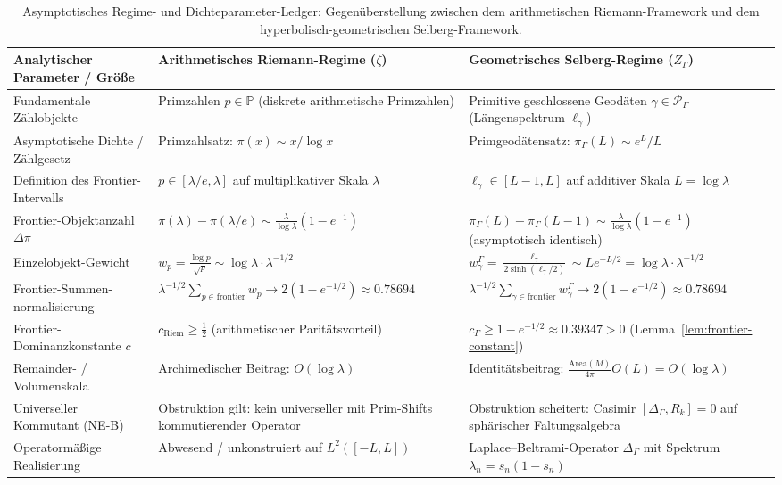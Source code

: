 \documentclass[12pt,a4paper]{article}
\theoremstyle{definition}
\theoremstyle{remark}
\newcommand{\Sel}{Z_{\Gamma}}
\newcommand{\Delop}{\Delta_{\Gamma}}
\begin{document}
\begin{table}[htbp]
\centering
\footnotesize
\setlength{\tabcolsep}{4pt}
{\renewcommand{\arraystretch}{1.15}
\begin{tabularx}{\textwidth}{@{}L{3.4cm}YY@{}}
\toprule
\textbf{Analytischer Parameter / Größe} & \textbf{Arithmetisches Riemann-Regime ($\zeta$)} & \textbf{Geometrisches Selberg-Regime ($\Sel$)} \\
\midrule
Fundamentale Zählobjekte
  & Primzahlen $p \in \mathbb{P}$ (diskrete arithmetische Primzahlen)
  & Primitive geschlossene Geodäten $\gamma \in \mathcal{P}_\Gamma$ (Längenspektrum $\ell_\gamma$) \\[3pt]
Asymptotische Dichte / Zählgesetz
  & Primzahlsatz: $\pi(x) \sim x / \log x$
  & Primgeodätensatz: $\pi_\Gamma(L) \sim e^L / L$ \\[3pt]
Definition des Frontier-Intervalls
  & $p \in [\lambda/e, \lambda]$ auf multiplikativer Skala $\lambda$
  & $\ell_\gamma \in [L-1, L]$ auf additiver Skala $L = \log\lambda$ \\[3pt]
Frontier-Objektanzahl $\Delta \pi$
  & $\pi(\lambda) - \pi(\lambda/e) \sim \frac{\lambda}{\log\lambda}(1 - e^{-1})$
  & $\pi_\Gamma(L) - \pi_\Gamma(L-1) \sim \frac{\lambda}{\log\lambda}(1 - e^{-1})$ (asymptotisch identisch) \\[3pt]
Einzelobjekt-Gewicht
  & $w_p = \frac{\log p}{\sqrt{p}} \sim \log\lambda \cdot \lambda^{-1/2}$
  & $w^\Gamma_\gamma = \frac{\ell_\gamma}{2\sinh(\ell_\gamma/2)} \sim L e^{-L/2} = \log\lambda \cdot \lambda^{-1/2}$ \\[3pt]
Frontier-Summen-\allowbreak normalisierung
  & $\lambda^{-1/2}\sum_{p \in \mathrm{frontier}} w_p \to 2(1-e^{-1/2}) \approx 0.78694$
  & $\lambda^{-1/2}\sum_{\gamma \in \mathrm{frontier}} w^\Gamma_\gamma \to 2(1-e^{-1/2}) \approx 0.78694$ \\[3pt]
Frontier-Dominanzkonstante $c$
  & $c_{\mathrm{Riem}} \ge \tfrac{1}{2}$ (arithmetischer Paritätsvorteil)
  & $c_\Gamma \ge 1 - e^{-1/2} \approx 0.39347 > 0$ (Lemma~\ref{lem:frontier-constant}) \\[3pt]
Remainder- / Volumenskala
  & Archimedischer Beitrag: $O(\log\lambda)$
  & Identitätsbeitrag: $\frac{\mathrm{Area}(M)}{4\pi} O(L) = O(\log\lambda)$ \\[3pt]
Universeller Kommutant (NE-B)
  & Obstruktion gilt: kein universeller mit Prim-Shifts kommutierender Operator
  & Obstruktion scheitert: Casimir $[\Delop, R_k] = 0$ auf sphärischer Faltungsalgebra \\[3pt]
Operatormäßige Realisierung
  & Abwesend / unkonstruiert auf $L^2([-L,L])$
  & Laplace--Beltrami-Operator $\Delop$ mit Spektrum $\lambda_n = s_n(1-s_n)$ \\
\bottomrule
\end{tabularx}}
\caption{Asymptotisches Regime- und Dichteparameter-Ledger: Gegenüberstellung zwischen dem arithmetischen Riemann-Framework und dem hyperbolisch-geometrischen Selberg-Framework.}
\label{tab:asymptotic-regime-comparison}
\end{table}
\end{document}
